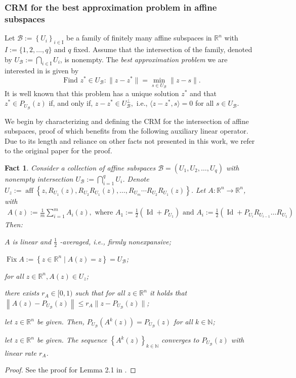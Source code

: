 \documentclass[smallextended,numbook,nospthms]{svjour3}
\theoremstyle{plain}
\newtheorem{fact}[theorem]{Fact}
\theoremstyle{definition}
\def\RR{\mathds R}
\def\NN{\mathds N}
\DeclareMathOperator{\Id}{Id}
\DeclareMathOperator{\Fix}{Fix}
\begin{document}
\subsubsection{CRM for the best approximation problem in affine subspaces}
Let $\mathcal{B}:=\left\{U_{i}\right\}_{i \in \mathrm{I}}$ be a family of finitely many affine subspaces in $\RR^{n}$ with $I:=\{1,2, \ldots, q\}$ and $q$ fixed. Assume that the intersection of the family, denoted by $U_{\mathcal{B}}:=\bigcap_{i \in \mathrm{I}} U_{i}$, is nonempty. The \emph{best approximation problem} we are interested in is given by
$$
\text{Find }z^* \in U_{\mathcal{B}}: \|z-z^*\| = \min _{s \in U_{\mathcal{B}}}\|z-s\|.
$$
It is well known that this problem has a unique solution $z^*$ and that $z^* \in P_{U_{\mathcal{B}}}(z)$ if, and only if, $z-z^* \in U_{\mathcal{B}}^{\perp},$ i.e., $\langle z-z^*, s\rangle=0$ for all $s \in U_{\mathcal{B}}$.

We begin by characterizing and defining the CRM for the intersection of affine subspaces, proof of which benefits from the following auxiliary linear operator. Due to its length and reliance on other facts not presented in this work, we refer to the original paper for the proof.
\begin{fact}\label{fact:CRM aux op}
	Consider a collection of affine subspaces $\mathcal{B}=\left(U_{1}, U_{2}, \ldots, U_{q}\right)$ with nonempty intersection $U_{\mathcal{B}}:=\bigcap_{i=1}^{q} U_{i}$. Denote $U_{z}:= \operatorname{aff}\left\{z, R_{U_{1}}(z), R_{U_{2}} R_{U_{1}}(z), \ldots, R_{U_{m}} \cdots R_{U_{2}} R_{U_{1}}(z)\right\}$. Let $A: \RR^{n} \rightarrow \RR^{n}$, with
	\begin{align}
		A(z):=\frac{1}{m} \sum_{i=1}^{m} A_{i}(z), \text { where } 
		A_{1}:=\frac{1}{2}\left(\Id+P_{U_{1}}\right) \text { and }  A_{i}:=\frac{1}{2}\left(\Id+P_{U_{i}} R_{U_{i-1}} \ldots R_{U_{1}}\right)
	\end{align}
	Then:
	\begin{listi}
		\item $A$ is linear and $\frac{1}{2}$ -averaged, i.e., firmly nonexpansive;
		\item $\Fix A:=\left\{z \in \RR^{n} \mid A(z)=z\right\}=U_{\mathcal{B}}$;
		\item for all $z \in \RR^{n}, A(z) \in U_{z}$;
		\item there exists $r_{A} \in[0,1)$ such that for all $z \in \RR^{n}$ it holds that $\left\|A(z)-P_{U_{\mathcal{B}}}(z)\right\| \leq r_{A} \| z-P_{U_{\mathcal{B}}}(z)\|$;
		\item let $z \in \RR^{n}$ be given. Then, $P_{U_{\mathcal{B}}}\left(A^{k}(z)\right)=P_{U_{\mathcal{B}}}(z)$ for all $k \in \NN$;
		\item let $z \in \RR^{n}$ be given. The sequence $\left\{A^{k}(z)\right\}_{k \in \NN}$ converges to $P_{U_{\mathcal{B}}}(z)$ with linear rate $r_{A}$.
	\end{listi}
\end{fact}
\begin{proof}
	See the proof for Lemma 2.1 in \cite{Behling:2018a}.
\end{proof}
\end{document}
